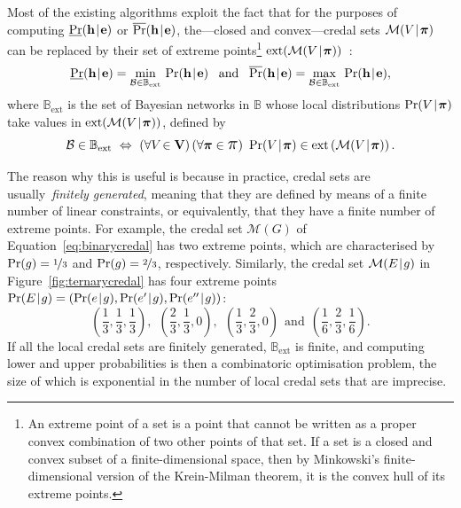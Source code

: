 \documentclass[10pt,a4paper]{paper}
\theoremstyle{definition}
\newcommand{\vbpi}{\boldsymbol\pi}
\newcommand{\vpi}{\scalebox{1.4}{\ensuremath\pi}}
\newcommand{\hyp}{\mathbf{h}}
\newcommand{\ev}{\mathbf{e}}
\newcommand{\credal}{\mathcal{M}}
\newcommand{\newmid}{\hspace{0.9pt}\vert\hspace{0.9pt}}
\begin{document}
Most of the existing algorithms exploit the fact that for the purposes of computing $\underline{\Pr}(\hyp\newmid\ev)$ or $\overline{\Pr}(\hyp\newmid\ev)$, the---closed and convex---credal sets $\credal(V\newmid\vbpi)$ can be replaced by their set of extreme points\footnote{An extreme point of a set is a point that cannot be written as a proper convex combination of two other points of that set. If a set is a closed and convex subset of a finite-dimensional space, then by Minkowski's finite-dimensional version of the Krein-Milman theorem, it is the convex hull of its extreme points.} $\mathrm{ext}(\credal(V\newmid\vbpi))$~\cite{Fagiuoli:1998ft}:
\begin{equation*}
\underline{\Pr}(\hyp \newmid \ev)
=
\min_{\mathcal{B}\in\mathbb{B}_{\mathrm{ext}}}
\,
\Pr(\hyp \newmid \ev)
\text{~~\,and\,~~}
\overline{\Pr}(\hyp \newmid \ev)
=
\max_{\mathcal{B}\in\mathbb{B}_{\mathrm{ext}}}\,
\Pr(\hyp \newmid \ev),
\end{equation*}
where $\mathbb{B}_{\mathrm{ext}}$ is the set of Bayesian networks in $\mathbb{B}$ whose local distributions $\Pr(V\newmid\vbpi)$ take values in $\mathrm{ext}(\credal(V\newmid\vbpi))$, defined by
\begin{equation*}
\mathcal{B}\in\mathbb{B}_{\mathrm{ext}}
~
\Leftrightarrow
~
(\forall V\!\in{\bf V})\,
(\forall \vbpi\in\vpi)~
\Pr(V\newmid\vbpi)\in\mathrm{ext}
\left(\credal(V\newmid\vbpi)\right).
\end{equation*}

The reason why this is useful is because in practice, credal sets are usually~\emph{finitely generated}, meaning that they are defined by means of a finite number of linear constraints, or equivalently, that they have a finite number of extreme points. For example, the credal set $\credal(G)$ of Equation~\eqref{eq:binarycredal} has two extreme points, which are characterised by $\Pr(g)=\nicefrac{1}{3}$ and $\Pr(g)=\nicefrac{2}{3}$, respectively. Similarly, the credal set $\credal(E\newmid g)$ in Figure~\ref{fig:ternarycredal} has four extreme points $\Pr(E\newmid g)=(\Pr(e\newmid g),\Pr(e'\newmid g),\Pr(e''\newmid g))$:
\begin{equation}\label{eq:fourextremepoints}
(\frac{1}{3},\frac{1}{3},\frac{1}{3}),~~
(\frac{2}{3},\frac{1}{3},0),~~
(\frac{1}{3},\frac{2}{3},0)~~\text{and}~~
(\frac{1}{6},\frac{2}{3},\frac{1}{6}).
\end{equation}
If all the local credal sets are finitely generated, $\mathbb{B}_{\mathrm{ext}}$ is finite, and computing lower and upper probabilities is then a combinatoric optimisation problem, the size of which is exponential in the number of local credal sets that are imprecise. 
\end{document}
